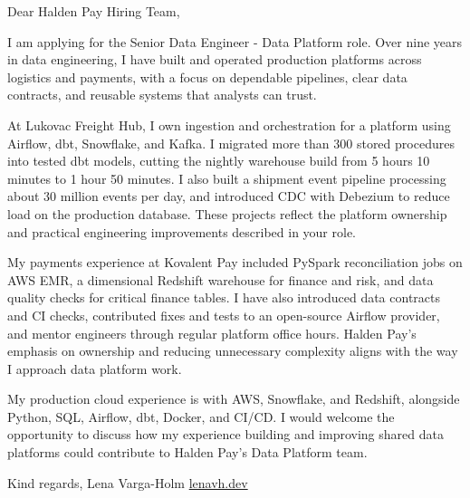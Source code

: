 \documentclass[11pt,a4paper]{article}
\begin{document}
Dear Halden Pay Hiring Team,

I am applying for the Senior Data Engineer - Data Platform role. Over nine years in data engineering, I have built and operated production platforms across logistics and payments, with a focus on dependable pipelines, clear data contracts, and reusable systems that analysts can trust.

At Lukovac Freight Hub, I own ingestion and orchestration for a platform using Airflow, dbt, Snowflake, and Kafka. I migrated more than 300 stored procedures into tested dbt models, cutting the nightly warehouse build from 5 hours 10 minutes to 1 hour 50 minutes. I also built a shipment event pipeline processing about 30 million events per day, and introduced CDC with Debezium to reduce load on the production database. These projects reflect the platform ownership and practical engineering improvements described in your role.

My payments experience at Kovalent Pay included PySpark reconciliation jobs on AWS EMR, a dimensional Redshift warehouse for finance and risk, and data quality checks for critical finance tables. I have also introduced data contracts and CI checks, contributed fixes and tests to an open-source Airflow provider, and mentor engineers through regular platform office hours. Halden Pay's emphasis on ownership and reducing unnecessary complexity aligns with the way I approach data platform work.

My production cloud experience is with AWS, Snowflake, and Redshift, alongside Python, SQL, Airflow, dbt, Docker, and CI/CD. I would welcome the opportunity to discuss how my experience building and improving shared data platforms could contribute to Halden Pay's Data Platform team.

Kind regards,
Lena Varga-Holm
\href{https://lenavh.dev}{lenavh.dev}
\end{document}
